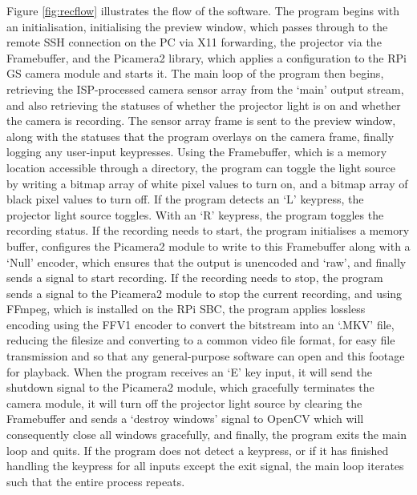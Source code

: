 Figure \ref{fig:recflow} illustrates the flow of the software. The program begins with an initialisation, initialising the preview window, which passes through to the remote SSH connection on the PC via X11 forwarding, the projector via the Framebuffer, and the Picamera2 library, which applies a configuration to the RPi GS camera module and starts it. The main loop of the program then begins, retrieving the ISP-processed camera sensor array from the `main' output stream, and also retrieving the statuses of whether the projector light is on and whether the camera is recording. The sensor array frame is sent to the preview window, along with the statuses that the program overlays on the camera frame, finally logging any user-input keypresses. Using the Framebuffer, which is a memory location accessible through a directory, the program can toggle the light source by writing a bitmap array of white pixel values to turn on, and a bitmap array of black pixel values to turn off. If the program detects an `L' keypress, the projector light source toggles. With an `R' keypress, the program toggles the recording status. If the recording needs to start, the program initialises a memory buffer, configures the Picamera2 module to write to this Framebuffer along with a `Null' encoder, which ensures that the output is unencoded and `raw', and finally sends a signal to start recording. If the recording needs to stop, the program sends a signal to the Picamera2 module to stop the current recording, and using FFmpeg, which is installed on the RPi SBC, the program applies lossless encoding using the FFV1 encoder to convert the bitstream into an `.MKV' file, reducing the filesize and converting to a common video file format, for easy file transmission and so that any general-purpose software can open and this footage for playback. When the program receives an `E' key input, it will send the shutdown signal to the Picamera2 module, which gracefully terminates the camera module, it will turn off the projector light source by clearing the Framebuffer and sends a `destroy windows' signal to OpenCV which will consequently close all windows gracefully, and finally, the program exits the main loop and quits. If the program does not detect a keypress, or if it has finished handling the keypress for all inputs except the exit signal, the main loop iterates such that the entire process repeats.

